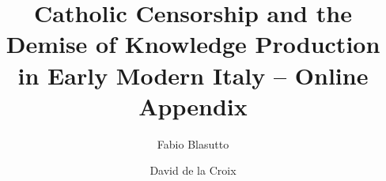 \documentclass[12pt]{article}
\title{Catholic Censorship and the Demise of Knowledge Production in Early Modern Italy -- Online Appendix}
\author{Fabio Blasutto \and David de la Croix}
\numberwithin{equation}{section}
\begin{document}
\maketitle

\onehalfspacing


\renewcommand\thefigure{\thesection.\arabic{figure}}
\renewcommand\thetable{\thesection.\arabic{table}}

\appendix





\clearpage



\end{document}
